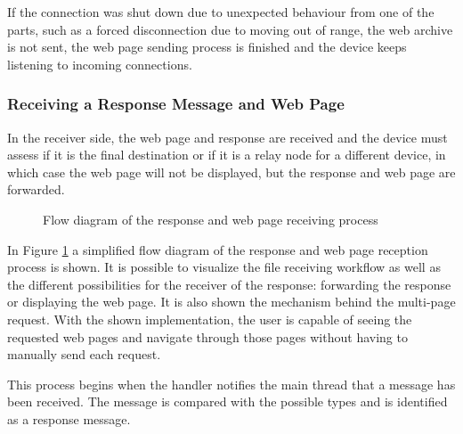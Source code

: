 If the connection was shut down due to unexpected behaviour from one of the parts, such as a forced disconnection due to moving out of range, the web archive is not sent, the web page sending process is finished and the device keeps listening to incoming connections.

\subsubsection{Receiving a Response Message and Web Page}
\label{subsubsec:rcvrsp}

In the receiver side, the web page and response are received and the device must assess if it is the final destination or if it is a relay node for a different device, in which case the web page will not be displayed, but the response and web page are forwarded.

\begin{figure}[ht]
	\noindent{}
	\caption{\label{fig:rsprcvflux} Flow diagram of the response and web page receiving process}
\end{figure}

In Figure \ref{fig:rsprcvflux} a simplified flow diagram of the response and web page reception process is shown. It is possible to visualize the file receiving workflow as well as the different possibilities for the receiver of the response: forwarding the response or displaying the web page. It is also shown the mechanism behind the multi-page request. With the shown implementation, the user is capable of seeing the requested web pages and navigate through those pages without having to manually send each request.

This process begins when the handler notifies the main thread that a message has been received. The message is compared with the possible types and is identified as a response message.

